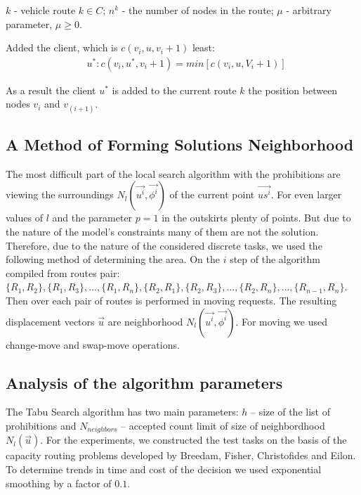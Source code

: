\documentclass[]{TAACpaper}
\begin{document}
$k$ - vehicle route $k\in C$;
$n^k$ - the number of nodes in the route;
$\mu$ - arbitrary parameter, $\mu \ge 0 $.

Added the client, which is $c(v_i,u,v_i+1)$ least:
\begin{align} 
& u^*:c(v_i,u^*,v_i+1)=min[c(v_i,u,V_i+1)]
\end{align}	

As a result the client $u^*$ is added to the current route $k$ the position between nodes $v_i$ and $v_(i+1)$.

\subsection{A Method of Forming Solutions Neighborhood}
The most difficult part of the local search algorithm with the prohibitions are viewing the surroundings $N_l(\vec{u^i},\vec{\phi^i})$ of the current point $\vec{us^i}$. For even larger values of $l$ and the parameter $p=1$ in the outskirts plenty of points. But due to the nature of the model's constraints many of them are not the solution. Therefore, due to the nature of the considered discrete tasks, we used the following method of determining the area. On the $i$ step of the algorithm compiled from routes pair: $\{R_1,R_2\},\{R_1,R_3\},\dots,\{R_1,R_n\},\{R_2,R_1\}, \{R_2,R_3\},\dots,\{R_2,R_n\},\dots,\{R_{n-1},R_{n}\}$. Then over each pair of routes is performed in moving requests. The resulting displacement vectors $\vec{u}$ are neighborhood $N_l(\vec{u^i},\vec{\phi^i})$. For moving  we used change-move  and swap-move operations.


\subsection{Analysis of the algorithm parameters}
The Tabu Search algorithm has two main parameters: $h$ -- size of the list of prohibitions and $N_{neighbors}$ -- accepted count limit of size of neighbordhood $N_l(\vec{u})$. For the experiments, we constructed the test tasks on the basis of the capacity routing problems developed by Breedam, Fisher, Christofides and Eilon. To determine trends in time and cost of the decision we used exponential smoothing by a factor of $0.1$.
\end{document}
